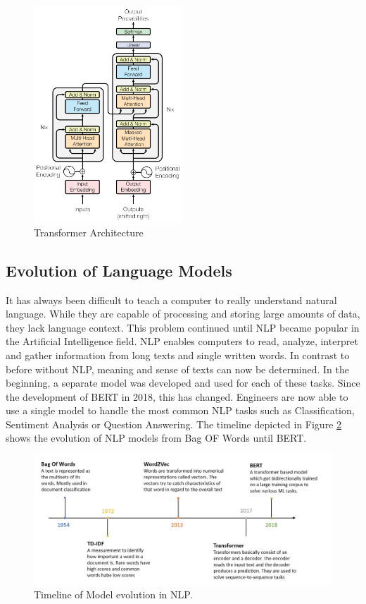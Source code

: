 \begin{figure}[H]
	\centering
	\includegraphics[width=0.5\textwidth]{figures/transformer_architecture.png}
	\caption{Transformer Architecture}
	\label{fig:transformer}
\end{figure}

\subsection{Evolution of Language Models}
It has always been difficult to teach a computer to really understand natural language. While they are capable of processing and storing large amounts of data, they lack language context. This problem continued until NLP became popular in the Artificial Intelligence field. NLP enables computers to read, analyze, interpret and gather information from long texts and single written words. In contrast to before without NLP, meaning and sense of texts can now be determined. In the beginning, a separate model was developed and used for each of these tasks. Since the development of BERT in 2018, this has changed. Engineers are now able to use a single model to handle the most common NLP tasks such as Classification, Sentiment Analysis or Question Answering. The timeline depicted in Figure \ref{fig:timeline} shows the evolution of NLP models from \alert{Bag OF Words} until \alert{BERT}.

\begin{figure}[H]
	\centering
	\includegraphics[width=1\textwidth]{figures/timeline_NLP.PNG}
	\caption{Timeline of Model evolution in NLP.}
	\label{fig:timeline}
\end{figure}

